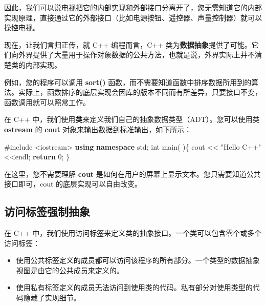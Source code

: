 \documentclass[
]{article}
\newenvironment{Shaded}{}{}
\newcommand{\ControlFlowTok}[1]{\textcolor[rgb]{0.00,0.44,0.13}{\textbf{#1}}}
\newcommand{\DataTypeTok}[1]{\textcolor[rgb]{0.56,0.13,0.00}{#1}}
\newcommand{\DecValTok}[1]{\textcolor[rgb]{0.25,0.63,0.44}{#1}}
\newcommand{\ImportTok}[1]{#1}
\newcommand{\KeywordTok}[1]{\textcolor[rgb]{0.00,0.44,0.13}{\textbf{#1}}}
\newcommand{\NormalTok}[1]{#1}
\newcommand{\OperatorTok}[1]{\textcolor[rgb]{0.40,0.40,0.40}{#1}}
\newcommand{\PreprocessorTok}[1]{\textcolor[rgb]{0.74,0.48,0.00}{#1}}
\newcommand{\StringTok}[1]{\textcolor[rgb]{0.25,0.44,0.63}{#1}}
\providecommand{\tightlist}{%
  \setlength{\itemsep}{0pt}\setlength{\parskip}{0pt}}
\begin{document}
因此，我们可以说电视把它的内部实现和外部接口分离开了，您无需知道它的内部实现原理，直接通过它的外部接口（比如电源按钮、遥控器、声量控制器）就可以操控电视。

现在，让我们言归正传，就 C++ 编程而言，C++
类为\textbf{数据抽象}提供了可能。它们向外界提供了大量用于操作对象数据的公共方法，也就是说，外界实际上并不清楚类的内部实现。

例如，您的程序可以调用 \textbf{sort()}
函数，而不需要知道函数中排序数据所用到的算法。实际上，函数排序的底层实现会因库的版本不同而有所差异，只要接口不变，函数调用就可以照常工作。

在 C++
中，我们使用\textbf{类}来定义我们自己的抽象数据类型（ADT）。您可以使用类
\textbf{ostream} 的 \textbf{cout} 对象来输出数据到标准输出，如下所示：

\begin{Shaded}
\begin{Highlighting}[]
\PreprocessorTok{\#include }\ImportTok{\textless{}iostream\textgreater{}}
\KeywordTok{using} \KeywordTok{namespace}\NormalTok{ std}\OperatorTok{;}
\DataTypeTok{int}\NormalTok{ main}\OperatorTok{(} \OperatorTok{)\{}
\NormalTok{   cout }\OperatorTok{\textless{}\textless{}} \StringTok{"Hello C++"} \OperatorTok{\textless{}\textless{}}\NormalTok{endl}\OperatorTok{;}   
   \ControlFlowTok{return} \DecValTok{0}\OperatorTok{;}
\OperatorTok{\}}
\end{Highlighting}
\end{Shaded}

在这里，您不需要理解 \textbf{cout}
是如何在用户的屏幕上显示文本。您只需要知道公共接口即可，cout
的底层实现可以自由改变。

\hypertarget{ux8bbfux95eeux6807ux7b7eux5f3aux5236ux62bdux8c61}{%
\subsection{访问标签强制抽象}\label{ux8bbfux95eeux6807ux7b7eux5f3aux5236ux62bdux8c61}}

在 C++
中，我们使用访问标签来定义类的抽象接口。一个类可以包含零个或多个访问标签：

\begin{itemize}
\tightlist
\item
  使用公共标签定义的成员都可以访问该程序的所有部分。一个类型的数据抽象视图是由它的公共成员来定义的。
\item
  使用私有标签定义的成员无法访问到使用类的代码。私有部分对使用类型的代码隐藏了实现细节。
\end{itemize}
\end{document}
